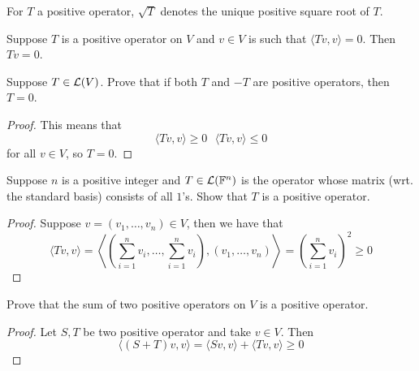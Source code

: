 \documentclass{extarticle}
\begin{document}
\begin{remark}
    For \(T\) a positive operator, \(\sqrt{T}\) denotes the unique positive square root of \(T\).
\end{remark}

\begin{corollary}
    Suppose \(T\) is a positive operator on \(V\) and \(v \in V\) is such that \(\langle Tv,v \rangle = 0\). 
    Then \(Tv = 0\).
\end{corollary}


\newpage 
{}

\begin{problem}{1}
    Suppose \(T \in \mathcal{L}(V)\). Prove that if both \(T\) and \(-T\) are positive operators, then 
    \(T = 0\).
\end{problem}

\begin{proof}
This means that 
\[\langle Tv,v \rangle \geq 0 \ \ \ \langle Tv,v \rangle \leq 0\]
for all \(v \in V\), so \(T = 0\).
\end{proof}

\begin{problem}{3}
    Suppose \(n\) is a positive integer and \(T \in \mathcal{L}(\mathbb{F}^n)\) is the operator whose matrix (wrt. 
    the standard basis) consists of all \(1\)'s. Show that \(T\) is a positive operator.
\end{problem}

\begin{proof}
Suppose \(v = (v_1, \ldots, v_n) \in V\), then we have that 
\[\langle Tv,v \rangle 
= \left\langle \left(\sum_{i=1}^{n} v_i, \ldots, \sum_{i=1}^{n} v_i \right), (v_1, \ldots, v_n) \right\rangle
= \left(\sum_{i=1}^{n} v_i \right)^2 \geq 0\]
\end{proof}

\begin{problem}{6}
    Prove that the sum of two positive operators on \(V\) is a positive operator.
\end{problem}

\begin{proof}
Let \(S, T\) be two positive operator and take \(v \in V\). Then 
\[\langle (S+T)v,v \rangle = \langle Sv,v \rangle + \langle Tv,v \rangle \geq 0\]
\end{proof}
\end{document}
